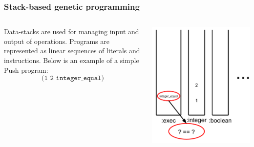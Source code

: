\documentclass{beamer}
\newcommand{\linespace}{\vskip 0.25cm}
\begin{document}
\begin{frame}
	\frametitle{Stack-based genetic programming}
	\begin{columns}
		\begin{column}{0.6\textwidth}
			Data-stacks are used for managing input and output of operations.
			\linespace
			\linespace
			\linespace
			Programs are represented as linear sequences of literals and instructions. Below is an example of a simple Push program:
			\[\texttt{(1 2 integer\_equal)}\]
		\end{column}
		\begin{column}{0.4\textwidth}
			\includegraphics[height=1.2\textwidth]{Illustrations/stack_6.PDF}
		\end{column}
	\end{columns}
\end{frame}
\end{document}
